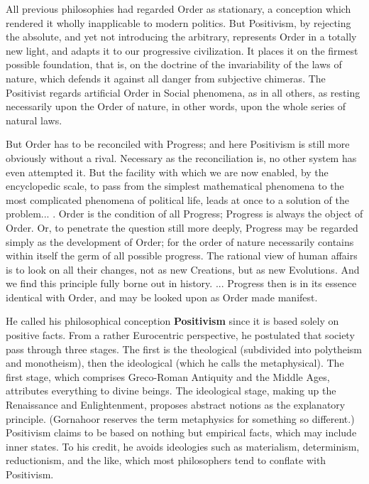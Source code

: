 \begin{quotationx}
All previous philosophies had regarded Order as stationary, a conception which rendered it wholly inapplicable to modern politics. But Positivism, by rejecting the absolute, and yet not introducing the arbitrary, represents Order in a totally new light, and adapts it to our progressive civilization. It places it on the firmest possible foundation, that is, on the doctrine of the invariability of the laws of nature, which defends it against all danger from subjective chimeras. The Positivist regards artificial Order in Social phenomena, as in all others, as resting necessarily upon the Order of nature, in other words, upon the whole series of natural laws.

But Order has to be reconciled with Progress; and here Positivism is still more obviously without a rival. Necessary as the reconciliation is, no other system has even attempted it. But the facility with which we are now enabled, by the encyclopedic scale, to pass from the simplest mathematical phenomena to the most complicated phenomena of political life, leads at once to a solution of the problem... . Order is the condition of all Progress; Progress is always the object of Order. Or, to penetrate the question still more deeply, Progress may be regarded simply as the development of Order; for the order of nature necessarily contains within itself the germ of all possible progress. The rational view of human affairs is to look on all their changes, not as new Creations, but as new Evolutions. And we find this principle fully borne out in history. ... Progress then is in its essence identical with Order, and may be looked upon as Order made manifest.
\end{quotationx}


He called his philosophical conception \textbf{Positivism} since it is based solely on positive facts. From a rather Eurocentric perspective, he postulated that society pass through three stages. The first is the theological (subdivided into polytheism and monotheism), then the ideological (which he calls the metaphysical). The first stage, which comprises Greco-Roman Antiquity and the Middle Ages, attributes everything to divine beings. The ideological stage, making up the Renaissance and Enlightenment, proposes abstract notions as the explanatory principle. (Gornahoor reserves the term metaphysics for something so different.) Positivism claims to be based on nothing but empirical facts, which may include inner states. To his credit, he avoids ideologies such as materialism, determinism, reductionism, and the like, which most philosophers tend to conflate with Positivism.

